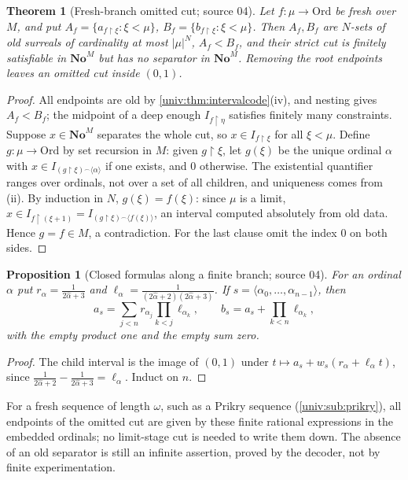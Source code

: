 \documentclass[11pt,letterpaper]{article}
\numberwithin{equation}{section}
\newtheorem{theorem}{Theorem}[section]
\newtheorem{proposition}[proposition]{Proposition}
\theoremstyle{definition}
\theoremstyle{remark}
\newcommand{\No}{\mathbf{No}}
\newcommand{\NoM}{\No^{M}}
\newcommand{\Ord}{\mathrm{Ord}}
\newcommand{\res}{\mathbin{\upharpoonright}}
\newcommand{\cat}{\mathbin{{}^{\frown}}}
\newcommand{\abs}[1]{\lvert#1\rvert}
\newcommand{\seq}[1]{\langle#1\rangle}
\newcommand{\hatord}[1]{\widehat{#1}}
\begin{document}
\begin{theorem}[Fresh-branch omitted cut; source 04]\label{univ:thm:freshcut}
Let $f:\mu\to\Ord$ be fresh over $M$, and put
$A_f=\{a_{f\res\xi}:\xi<\mu\}$, $B_f=\{b_{f\res\xi}:\xi<\mu\}$. Then $A_f,B_f$
are $N$-sets of old surreals of cardinality at most $\abs\mu^N$, $A_f<B_f$,
and their strict cut is finitely satisfiable in $\NoM$ but has no separator in
$\NoM$. Removing the root endpoints leaves an omitted cut inside $(0,1)$.
\end{theorem}
\begin{proof}
All endpoints are old by \cref{univ:thm:intervalcode}(iv), and nesting gives
$A_f<B_f$; the midpoint of a deep enough $I_{f\res\eta}$ satisfies finitely
many constraints. Suppose $x\in\NoM$ separates the whole cut, so
$x\in I_{f\res\xi}$ for all $\xi<\mu$. Define $g:\mu\to\Ord$ by set recursion
in $M$: given $g\res\xi$, let $g(\xi)$ be the unique ordinal $\alpha$ with
$x\in I_{(g\res\xi)\cat\seq\alpha}$ if one exists, and $0$ otherwise. The
existential quantifier ranges over ordinals, not over a set of all children,
and uniqueness comes from (ii). By induction in $N$, $g(\xi)=f(\xi)$: since
$\mu$ is a limit, $x\in I_{f\res(\xi+1)}=I_{(g\res\xi)\cat\seq{f(\xi)}}$, an
interval computed absolutely from old data. Hence $g=f\in M$, a contradiction.
For the last clause omit the index $0$ on both sides.
\end{proof}

\begin{proposition}[Closed formulas along a finite branch; source 04]\label{univ:prop:finiteformula}
For an ordinal $\alpha$ put
$r_\alpha=\frac1{2\hatord\alpha+3}$ and
$\ell_\alpha=\frac1{(2\hatord\alpha+2)(2\hatord\alpha+3)}$. If
$s=\seq{\alpha_0,\ldots,\alpha_{n-1}}$, then
\[
 a_s=\sum_{j<n}r_{\alpha_j}\prod_{k<j}\ell_{\alpha_k},\qquad
 b_s=a_s+\prod_{k<n}\ell_{\alpha_k},
\]
with the empty product one and the empty sum zero.
\end{proposition}
\begin{proof}
The child interval is the image of $(0,1)$ under
$t\mapsto a_s+w_s(r_\alpha+\ell_\alpha t)$, since
$\frac1{2\hatord\alpha+2}-\frac1{2\hatord\alpha+3}=\ell_\alpha$. Induct on $n$.
\end{proof}

For a fresh sequence of length $\omega$, such as a Prikry sequence
(\cref{univ:sub:prikry}), all endpoints of the omitted cut are given by these
finite rational expressions in the embedded ordinals; no limit-stage cut is
needed to write them down. The absence of an old separator is still an
infinite assertion, proved by the decoder, not by finite experimentation.
\end{document}
